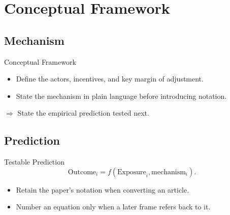 \section{Conceptual Framework}
\subsection{Mechanism}

\begin{frame}{Conceptual Framework}
  \begin{itemize}
    \item Define the actors, incentives, and key margin of adjustment.
    \item State the mechanism in plain language before introducing notation.
  \end{itemize}

  \vspace{0.4cm}
  {\color{crimson}$\Rightarrow$ State the empirical prediction tested next.}
\end{frame}

\subsection{Prediction}

\begin{frame}{Testable Prediction}
  \begin{equation*}
    \text{Outcome}_{i}=f\!\left(\text{Exposure}_{i},\text{mechanism}_{i}\right).
  \end{equation*}
  \begin{itemize}
    \item Retain the paper's notation when converting an article.
    \item Number an equation only when a later frame refers back to it.
  \end{itemize}
\end{frame}
